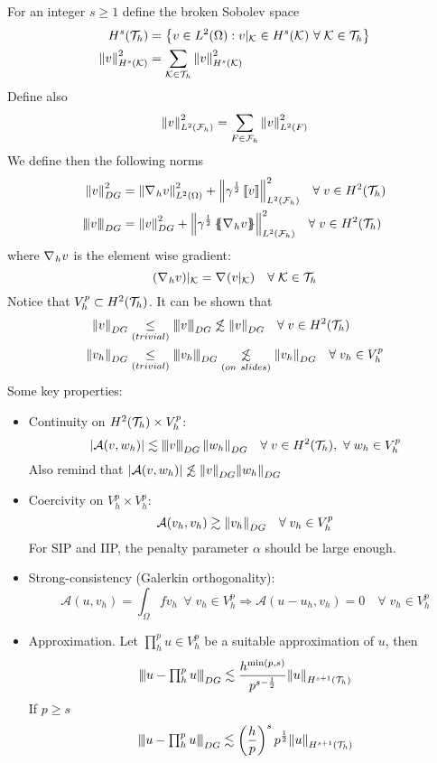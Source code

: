 For an integer \(s \geq 1\) define the broken Sobolev space
\begin{align*}
    H^s(\mathcal{T}_h) &= \left\{ v \in L^2(\Omega) : v\vert_{\mathcal{K}} \in H^s(\mathcal{K}) \ \forall \;\mathcal{K} \in \mathcal{T}_h\right\} \\
    \norm{v}^2_{H^s(\mathcal{K})} &= \sum_{\mathcal{K} \in \mathcal{T}_h} \norm{v}^2_{H^s(\mathcal{K})}
\end{align*}
Define also 
\[
    \norm{v}^2_{L^2(\mathcal{F}_h)} = \sum_{F \in \mathcal{F}_h} \norm{v}^2_{L^2(F)}
\]
We define then the following norms 
\begin{align*}
    \norm{v}^2_{DG} &= \norm{\grad_h v}^2_{L^2(\Omega)} + \norm{\gamma^{\frac{1}{2}}\jump{v}}^2_{L^2(\mathcal{F}_h)} \quad \forall \;v \in H^2(\triangulation) \\
    \threenorm{v}{DG} &= \norm{v}_{DG}^2 + \norm{\gamma ^{\frac{1}{2}} \average{\grad_h v}}^2_{L^2(\mathcal{F}_h)} \quad \forall \;v \in H^2(\triangulation)
\end{align*}
where \(\nabla\mspace{1mu}_h v\) is the element wise gradient:
\[
    (\nabla\mspace{1mu}_h v)\vert_{\mathcal{K}} = \nabla\mspace{1mu}(v\vert_{\mathcal{K}}) \quad\forall \; \mathcal{K} \in \mathcal{T}_h
\]
Notice that \(V_h^p \subset H^2(\mathcal{T}_h)\). It can be shown that 
\begin{align*}
    \norm{v}_{DG} &\underset{(trivial)}{\leq} \threenorm{v}{DG} \not\lesssim \norm{v}_{DG} \quad \forall \; v \in H^2(\triangulation) \\
    \norm{v_h}_{DG} &\underset{(trivial)}{\leq} \threenorm{v_h}{DG} \underset{(on \ slides)}{\not\lesssim}\norm{v_h}_{DG} \quad \forall \; v_h \in V_h^p \\
\end{align*}
Some key properties:
\begin{itemize}
    \item Continuity on \(H^2(\mathcal{T}_h) \times V^p_h\): 
    \[
        \abs{\mathcal{A}(v, w_h)} \lesssim \threenorm{v}{DG} \norm{w_h}_{DG} \quad  \forall \; v \in H^2(\triangulation), \ \forall \; w_h \in V_h^p
    \]
    Also remind that \(\abs{\mathcal{A}(v, w_h)} \not\lesssim \norm{v}_{DG} \norm{w_h}_{DG}\)
    \item Coercivity on \(V_h^p \times V_h^p\): 
    \[
        \mathcal{A}(v_h, v_h) \gtrsim \norm{v_h}_{DG} \quad \forall \; v_h \in V_h^p
    \]
    For SIP and IIP, the penalty parameter \(\alpha\) should be large enough.
    \item  Strong-consistency (Galerkin orthogonality):
    \[
        \mathcal{A}(u,v_h) = \int_\Omega f v_h \ \ \forall \; v_h \in V_h^p \Rightarrow \mathcal{A}(u-u_h, v_h) = 0 \quad \forall \; v_h \in V_h^p
    \]
    \item Approximation. Let \(\prod_{h}^{p}u \in V_h^p\) be a suitable approximation of \(u\), then 
    \[
        \threenorm{u-{\textstyle \prod_{h}^{p}u}}{DG} \lesssim \frac{h^{\min(p,s)}}{p^{s-\frac{1}{2}}}\norm{u}_{H^{s+1}(\triangulation)}
    \]
    If \(p \geq s\)
    \[
        \threenorm{u-{\textstyle \prod_{h}^{p}u}}{DG} \lesssim \left( \frac{h}{p} \right)^s p^{\frac{1}{2}}\norm{u}_{H^{s+1}(\triangulation)}
    \]
\end{itemize}
